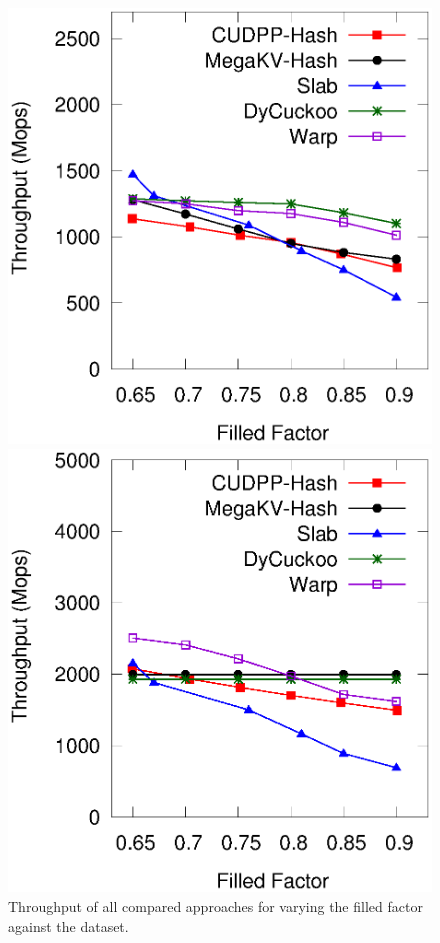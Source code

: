 \iffalse
\begin{figure}[h]
	\begin{minipage}{0.48\linewidth}\centering
		\includegraphics[width=\linewidth]{../pic/static-load_factor/ali/insert.eps}
		\centerline{}
	\end{minipage}
	\hfill
	\begin{minipage}{0.48\linewidth}\centering
		\includegraphics[width=\linewidth]{../pic/static-load_factor/ali/search.eps}
		\centerline{}
	\end{minipage}
	\caption{Throughput of all compared approaches for varying the filled factor against the \dsali dataset.}
	\label{fig:static-filled-factor}
\end{figure}

